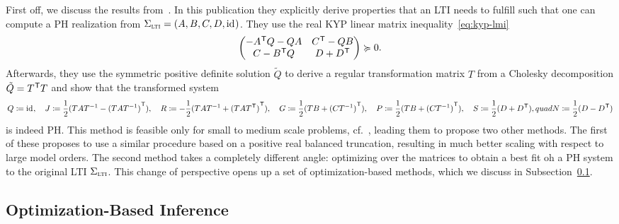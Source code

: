 First off, we discuss the results from~\cite{Beattie2022}.
In this publication they explicitly derive properties that an \ac{LTI} needs to fulfill such that one can compute a \ac{PH} realization from $\Sigma_{\textnormal{\scshape lti}} = (A, B, C, D, \text{id}_{})$.
They use the real \ac{KYP} linear matrix inequality~\eqref{eq:kyp-lmi}
\begin{equation*}
    \begin{pmatrix}
        - A^{\mkern1mu \mathsf{T}} Q - Q A & C^{\mkern1mu \mathsf{T}} - QB \\
        C - B^{\mkern1mu \mathsf{T}} Q & D + D^{\mkern1mu \mathsf{T}}
    \end{pmatrix} \succcurlyeq 0.
\end{equation*}
Afterwards, they use the symmetric positive definite solution $\tilde{Q}$ to derive a regular transformation matrix $T$ from a Cholesky decomposition $\tilde{Q} = T^{\mkern1mu \mathsf{T}} T$ and show that the transformed system
\begin{equation}\label{eq:ph-transformation-from-passive-system}
    Q \coloneqq \text{id}_{},\quad J \coloneqq \frac{1}{2} (T A T^{-1} - {(T A T^{-1})}^{\mkern1mu \mathsf{T}}),\quad R \coloneqq -\frac{1}{2} (T A T^{-1} + {(T A T^{\mkern1mu \mathsf{T}})}^{\mkern1mu \mathsf{T}}),\quad G \coloneqq \frac{1}{2} (T B + {(C T^{-1})}^{\mkern1mu \mathsf{T}}),\quad P \coloneqq \frac{1}{2} (T B + {(C T^{-1})}^{\mkern1mu \mathsf{T}}),\quad S \coloneqq \frac{1}{2} (D + D^{\mkern1mu \mathsf{T}}),quad N \coloneqq \frac{1}{2} (D - D^{\mkern1mu \mathsf{T}})
\end{equation}
is indeed \ac{PH}.
This method is feasible only for small to medium scale problems, cf.~\cite{Cherifi2019}, leading them to propose two other methods.
The first of these proposes to use a similar procedure based on a positive real balanced truncation, resulting in much better scaling with respect to large model orders.
The second method takes a completely different angle: optimizing over the matrices to obtain a best fit oh a \ac{PH} system to the original \ac{LTI} $\Sigma_{\textnormal{\scshape lti}}$.
This change of perspective opens up a set of optimization-based methods, which we discuss in Subsection~\ref{subsec:optimization-based-inference}.


\subsection{Optimization-Based Inference}\label{subsec:optimization-based-inference}

